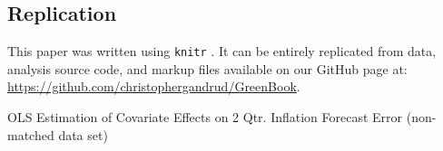 \documentclass[a4paper]{article}\usepackage{graphicx, color}
\begin{document}
\subsection*{Replication}

This paper was written using {\tt{knitr}} \citep{knitr2012}. It can be entirely replicated from data, analysis source code, and markup files available on our GitHub page at: {\url{https://github.com/christophergandrud/GreenBook}}. 


\begin{table}[ht]
    \caption{OLS Estimation of Covariate Effects on 2 Qtr. Inflation Forecast Error (non-matched data set)}
    \label{OutputNL}
    \vspace{0.25cm}
    \begin{center}
    {\tiny

}
\end{center}
\end{table}
\end{document}
